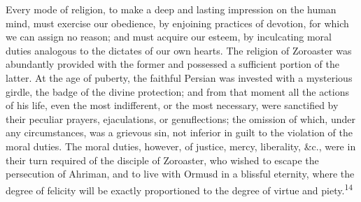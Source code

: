 Every mode of religion, to make a deep and lasting impression on
the human mind, must exercise our obedience, by enjoining
practices of devotion, for which we can assign no reason; and
must acquire our esteem, by inculcating moral duties analogous to
the dictates of our own hearts. The religion of Zoroaster was
abundantly provided with the former and possessed a sufficient
portion of the latter. At the age of puberty, the faithful
Persian was invested with a mysterious girdle, the badge of the
divine protection; and from that moment all the actions of his
life, even the most indifferent, or the most necessary, were
sanctified by their peculiar prayers, ejaculations, or
genuflections; the omission of which, under any circumstances,
was a grievous sin, not inferior in guilt to the violation of the
moral duties. The moral duties, however, of justice, mercy,
liberality, \&c., were in their turn required of the disciple of
Zoroaster, who wished to escape the persecution of Ahriman, and
to live with Ormusd in a blissful eternity, where the degree of
felicity will be exactly proportioned to the degree of virtue and
piety.\textsuperscript{14}


